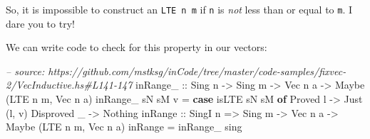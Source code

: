 \documentclass[]{article}
\newenvironment{Shaded}{}{}
\newcommand{\KeywordTok}[1]{\textcolor[rgb]{0.00,0.44,0.13}{\textbf{#1}}}
\newcommand{\DataTypeTok}[1]{\textcolor[rgb]{0.56,0.13,0.00}{#1}}
\newcommand{\CharTok}[1]{\textcolor[rgb]{0.25,0.44,0.63}{#1}}
\newcommand{\CommentTok}[1]{\textcolor[rgb]{0.38,0.63,0.69}{\textit{#1}}}
\newcommand{\OtherTok}[1]{\textcolor[rgb]{0.00,0.44,0.13}{#1}}
\newcommand{\FunctionTok}[1]{\textcolor[rgb]{0.02,0.16,0.49}{#1}}
\newcommand{\NormalTok}[1]{#1}
\begin{document}
\begin{Shaded}
\end{Shaded}

So, it is impossible to construct an \texttt{LTE\ n\ m} if \texttt{n} is
\emph{not} less than or equal to \texttt{m}. I dare you to try!

We can write code to check for this property in our vectors:

\begin{Shaded}
\begin{Highlighting}[]
\CommentTok{-- source: https://github.com/mstksg/inCode/tree/master/code-samples/fixvec-2/VecInductive.hs#L141-147}
\OtherTok{inRange_ ::} \DataTypeTok{Sing}\NormalTok{ n }\OtherTok{->} \DataTypeTok{Sing}\NormalTok{ m }\OtherTok{->} \DataTypeTok{Vec}\NormalTok{ n a }\OtherTok{->} \DataTypeTok{Maybe}\NormalTok{ (}\DataTypeTok{LTE}\NormalTok{ n m, }\DataTypeTok{Vec}\NormalTok{ n a)}
\NormalTok{inRange_ sN sM v }\FunctionTok{=} \KeywordTok{case}\NormalTok{ isLTE sN sM }\KeywordTok{of}
    \DataTypeTok{Proved}\NormalTok{ l    }\OtherTok{->} \DataTypeTok{Just}\NormalTok{ (l, v)}
    \DataTypeTok{Disproved}\NormalTok{ _ }\OtherTok{->} \DataTypeTok{Nothing}
\NormalTok{inRange}\OtherTok{ ::} \DataTypeTok{SingI}\NormalTok{ n }\OtherTok{=>} \DataTypeTok{Sing}\NormalTok{ m }\OtherTok{->} \DataTypeTok{Vec}\NormalTok{ n a }\OtherTok{->} \DataTypeTok{Maybe}\NormalTok{ (}\DataTypeTok{LTE}\NormalTok{ n m, }\DataTypeTok{Vec}\NormalTok{ n a)}
\NormalTok{inRange }\FunctionTok{=}\NormalTok{ inRange_ sing}
\end{Highlighting}
\end{Shaded}
\end{document}
